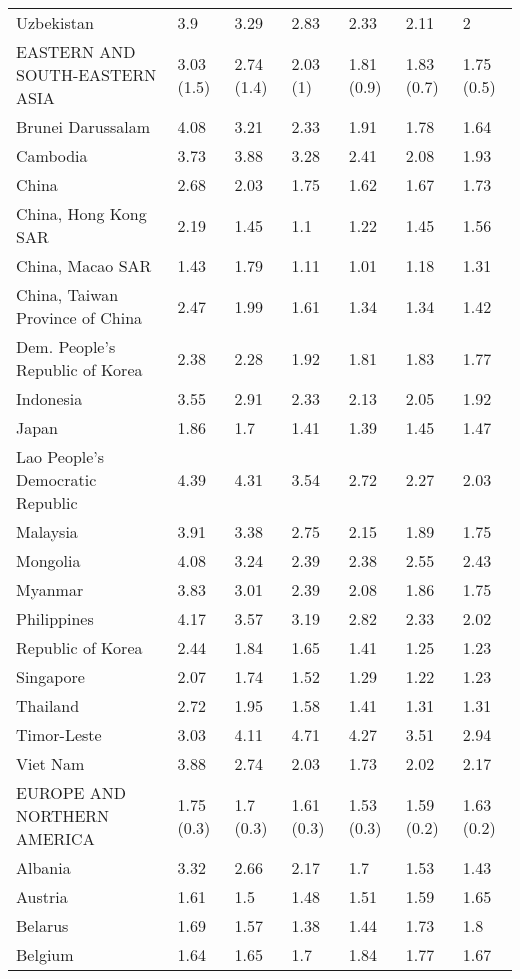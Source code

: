 \begin{longtable}[t]{lllllll}
Uzbekistan & 3.9 & 3.29 & 2.83 & 2.33 & 2.11 & 2\\
EASTERN AND SOUTH-EASTERN ASIA & 3.03 (1.5) & 2.74 (1.4) & 2.03 (1) & 1.81 (0.9) & 1.83 (0.7) & 1.75 (0.5)\\
Brunei Darussalam & 4.08 & 3.21 & 2.33 & 1.91 & 1.78 & 1.64\\
Cambodia & 3.73 & 3.88 & 3.28 & 2.41 & 2.08 & 1.93\\
China & 2.68 & 2.03 & 1.75 & 1.62 & 1.67 & 1.73\\
China, Hong Kong SAR & 2.19 & 1.45 & 1.1 & 1.22 & 1.45 & 1.56\\
China, Macao SAR & 1.43 & 1.79 & 1.11 & 1.01 & 1.18 & 1.31\\
China, Taiwan Province of China & 2.47 & 1.99 & 1.61 & 1.34 & 1.34 & 1.42\\
Dem. People's Republic of Korea & 2.38 & 2.28 & 1.92 & 1.81 & 1.83 & 1.77\\
Indonesia & 3.55 & 2.91 & 2.33 & 2.13 & 2.05 & 1.92\\
Japan & 1.86 & 1.7 & 1.41 & 1.39 & 1.45 & 1.47\\
Lao People's Democratic Republic & 4.39 & 4.31 & 3.54 & 2.72 & 2.27 & 2.03\\
Malaysia & 3.91 & 3.38 & 2.75 & 2.15 & 1.89 & 1.75\\
Mongolia & 4.08 & 3.24 & 2.39 & 2.38 & 2.55 & 2.43\\
Myanmar & 3.83 & 3.01 & 2.39 & 2.08 & 1.86 & 1.75\\
Philippines & 4.17 & 3.57 & 3.19 & 2.82 & 2.33 & 2.02\\
Republic of Korea & 2.44 & 1.84 & 1.65 & 1.41 & 1.25 & 1.23\\
Singapore & 2.07 & 1.74 & 1.52 & 1.29 & 1.22 & 1.23\\
Thailand & 2.72 & 1.95 & 1.58 & 1.41 & 1.31 & 1.31\\
Timor-Leste & 3.03 & 4.11 & 4.71 & 4.27 & 3.51 & 2.94\\
Viet Nam & 3.88 & 2.74 & 2.03 & 1.73 & 2.02 & 2.17\\
EUROPE AND NORTHERN AMERICA & 1.75 (0.3) & 1.7 (0.3) & 1.61 (0.3) & 1.53 (0.3) & 1.59 (0.2) & 1.63 (0.2)\\
Albania & 3.32 & 2.66 & 2.17 & 1.7 & 1.53 & 1.43\\
Austria & 1.61 & 1.5 & 1.48 & 1.51 & 1.59 & 1.65\\
Belarus & 1.69 & 1.57 & 1.38 & 1.44 & 1.73 & 1.8\\
Belgium & 1.64 & 1.65 & 1.7 & 1.84 & 1.77 & 1.67\\

\end{longtable}
